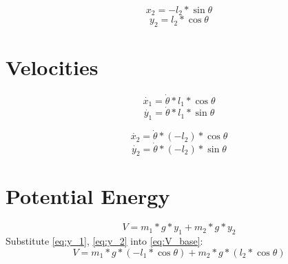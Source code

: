 \documentclass[titlepage]{article}
\numberwithin{equation}{section}
\begin{document}
\begin{equation}
x_2 = -l_2 * \sin \theta
\end{equation}
\begin{equation} \label{eq:y_2}
y_2 = l_2 * \cos \theta
\end{equation}

\section{Velocities}
\begin{equation} \label{eq:x_1_dot}
\dot{x_1} = \dot{\theta} * l_1 * \cos \theta
\end{equation}
\begin{equation} \label{eq:y_1_dot}
\dot{y_1} = \dot{\theta} * l_1 * \sin \theta
\end{equation}

\begin{equation} \label{eq:x_2_dot}
\dot{x_2} = \dot{\theta} * (-l_2) * \cos \theta
\end{equation}
\begin{equation} \label{eq:y_2_dot}
\dot{y_2} = \dot{\theta} * (-l_2) * \sin \theta
\end{equation}

\section{Potential Energy}
\begin{equation} \label{eq:V_base}
V = m_1 * g * y_1 + m_2 * g * y_2
\end{equation}
Substitute \ref{eq:y_1}, \ref{eq:y_2} into \ref{eq:V_base}:
\begin{equation} \label{eq:V}
V = m_1 * g * (-l_1 * \cos \theta) + m_2 * g * (l_2 * \cos \theta)
\end{equation}
\end{document}
